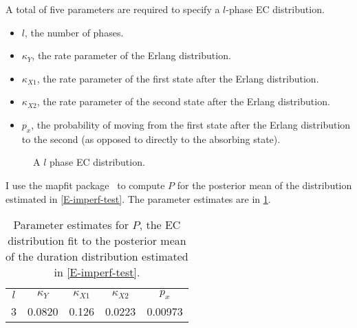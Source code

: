\documentclass[thesis.tex]{subfiles}
\begin{document}
A total of five parameters are required to specify a $l$-phase EC distribution.
\begin{itemize}
    \item $l$, the number of phases.
    \item $\kappa_Y$, the rate parameter of the Erlang distribution.
    \item $\kappa_{X1}$, the rate parameter of the first state after the Erlang distribution.
    \item $\kappa_{X2}$, the rate parameter of the second state after the Erlang distribution.
    \item $p_x$, the probability of moving from the first state after the Erlang distribution to the second (as opposed to directly to the absorbing state).
\end{itemize}
\begin{figure}
\caption{A $l$ phase EC distribution.}
\end{figure}


I use the mapfit package~\autocite{mapfit} to compute $P$ for the posterior mean of the distribution estimated in \cref{E-imperf-test}.
The parameter estimates are in \cref{SEIR:table:ec-params}.
\begin{table}
    \centering
    \begin{tabular}{c c c c c}
        $l$ & $\kappa_Y$ & $\kappa_{X1}$ & $\kappa_{X2}$ & $p_x$ \\
        3 & 0.0820 & 0.126 & 0.0223 & 0.00973  \\
    \end{tabular}
    \caption{Parameter estimates for $P$, the EC distribution fit to the posterior mean of the duration distribution estimated in \cref{E-imperf-test}.}
    \label{SEIR:table:ec-params}
\end{table}
\end{document}

